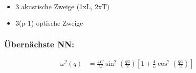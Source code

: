 \begin{itemize}
    \itemsep 0pt
    \item 3 akustische Zweige (1xL, 2xT)
    \item 3(p-1) optische Zweige
\end{itemize}

\subsubsection*{Übernächste NN:}
\begin{equation*}
    \begin{aligned}
        \omega^2(q) &= \frac{4C}{M} \sin^2\left(\frac{qa}{2}\right) \left[1+\frac{4}{\nu}\cos^2\left(\frac{qa}{2}\right)\right]
    \end{aligned}
\end{equation*}
